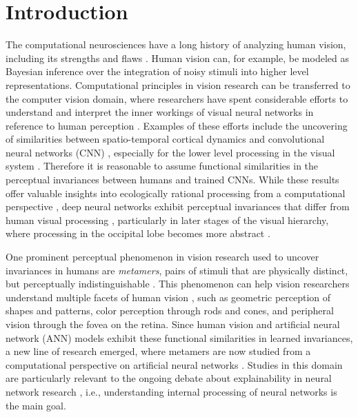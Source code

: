 \documentclass[pdflatex,sn-mathphys-num]{sn-jnl}%
\theoremstyle{thmstyleone}%
\theoremstyle{thmstyletwo}%
\theoremstyle{thmstylethree}%
\begin{document}
\section{Introduction}

The computational neurosciences have a long history of analyzing human vision, including its strengths and flaws \cite{marr2010vision}.
Human vision can, for example, be modeled as Bayesian inference over the integration of noisy stimuli \cite{yuille2006vision} into higher level representations.
Computational principles in vision research can be transferred to the computer vision domain, where researchers have spent considerable efforts to understand and interpret the inner workings of visual neural networks in reference to human perception \cite{celeghin2023convolutional, richards2019deep}.
Examples of these efforts include the uncovering of similarities between spatio-temporal cortical dynamics and convolutional neural networks (CNN) \cite{cichy2016comparison}, especially for the lower level processing in the visual system \cite{zheng2018processing}.
Therefore it is reasonable to assume functional similarities in the perceptual invariances between humans and trained CNNs.
While these results offer valuable insights into ecologically rational processing from a computational perspective \cite{todd2012ecological}, deep neural networks exhibit perceptual invariances that differ from human visual processing \cite{feather_model_2023}, particularly in later stages of the visual hierarchy, where processing in the occipital lobe becomes more abstract \cite{zheng2018processing}.

One prominent perceptual phenomenon in vision research used to uncover invariances in humans are \textit{metamers}, pairs of stimuli that are physically distinct, but perceptually indistinguishable \cite{broderick_foveated_2023}.
This phenomenon can help vision researchers understand multiple facets of human vision \cite{rosenholtz2016capabilities}, such as geometric perception of shapes and patterns, color perception through rods and cones, and peripheral vision through the fovea on the retina.
Since human vision and artificial neural network (ANN) models exhibit these functional similarities in learned invariances, a new line of research emerged, where metamers are now studied from a computational perspective on artificial neural networks \cite{feather_metamers_2019, feather_model_2023}.
Studies in this domain are particularly relevant to the ongoing debate about explainability in neural network research \cite{mahendran_understanding_2014,olah_building_2018,olah_feature_2017}, i.e., understanding internal processing of neural networks is the main goal.
\end{document}
